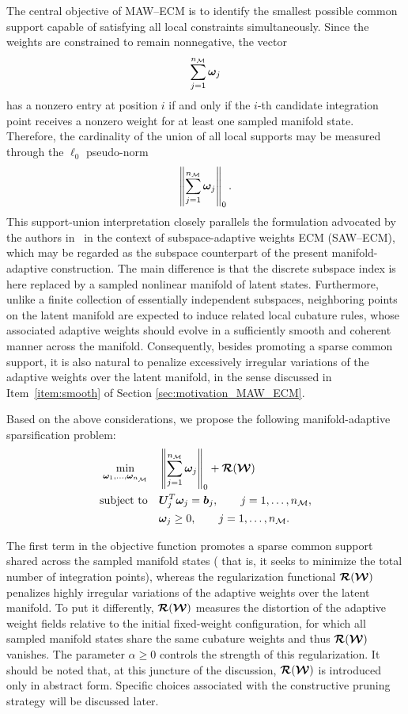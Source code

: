 \documentclass[11pt,a4paper]{article}
\begin{document}
The central objective of MAW--ECM is to identify the smallest possible common
support capable of satisfying all local constraints
simultaneously. Since the weights are constrained to remain nonnegative, the
vector
\[
\sum_{j=1}^{n_{\mathcal{M}}}\bm{\omega}_{j}
\]
has a nonzero entry at position \(i\) if and only if the \(i\)-th candidate
integration point receives a nonzero weight for at least one sampled manifold
state. Therefore,
the cardinality of the union of all local supports may be measured through the
\(\ell_0\) pseudo-norm
\begin{equation}
\label{eq:support1}
\left\|
\sum_{j=1}^{n_{\mathcal{M}}}
\bm{\omega}_{j}
\right\|_0 .
\end{equation}
This support-union interpretation closely parallels the formulation advocated
by the authors in~\cite{bravo2024subspace} in the context of subspace-adaptive
weights ECM (SAW--ECM), which may be regarded as the subspace counterpart of
the present manifold-adaptive construction. The main difference is that the
discrete subspace index is here replaced by a sampled nonlinear manifold of
latent states. Furthermore, unlike a finite collection of essentially
independent subspaces, neighboring points on the latent manifold are expected
to induce related local cubature rules, whose associated adaptive weights
should evolve in a sufficiently smooth and coherent manner across the manifold. Consequently, besides
promoting a sparse common support, it is also natural to penalize excessively
irregular variations of the adaptive weights over the latent manifold, in the
sense discussed in Item~\ref{item:smooth} of Section \ref{sec:motivation_MAW_ECM}.

Based on the above considerations, we propose the following
manifold-adaptive sparsification problem:
\begin{equation}
\begin{aligned}
\min_{\bm{\omega}_{1},\ldots,\bm{\omega}_{n_{\mathcal{M}}}}
\quad &
\left\|
\sum_{j=1}^{n_{\mathcal{M}}}
\bm{\omega}_{j}
\right\|_0
+
 \boldsymbol{\mathcal{R}}(\boldsymbol{\mathcal{W}})
\\
\text{subject to}
\quad &
\bm{U}_{j}^{T}\bm{\omega}_{j}
=
\bm{b}_{j},
\qquad
j=1,\ldots,n_{\mathcal{M}},
\\
&
\bm{\omega}_{j}\ge0,
\qquad
j=1,\ldots,n_{\mathcal{M}} .
\end{aligned}
\label{eq:MAW_global_l0}
\end{equation}

The first term in the objective function promotes a sparse common support shared
across the sampled manifold states ( that is, it seeks to minimize the total
number of integration points), whereas the regularization
functional \(\boldsymbol{\mathcal{R}}(\boldsymbol{\mathcal{W}})\) penalizes highly irregular variations of the adaptive
weights over the latent manifold. To put it differently, \(\boldsymbol{\mathcal{R}}(\boldsymbol{\mathcal{W}})\) measures the distortion of the adaptive
weight fields relative to the initial fixed-weight configuration, for which all
sampled manifold states share the same cubature weights and thus  \(\boldsymbol{\mathcal{R}}(\boldsymbol{\mathcal{W}})\) vanishes. The parameter \(\alpha\ge0\) controls the
strength of this regularization.  It should be noted that,  at this juncture of the discussion, \(\boldsymbol{\mathcal{R}}(\boldsymbol{\mathcal{W}})\)
is introduced only in abstract form.  Specific choices associated with the
constructive pruning strategy will be discussed later.
\end{document}
